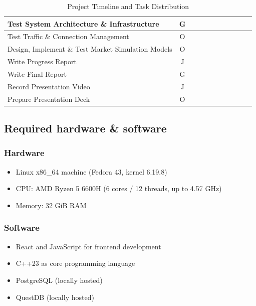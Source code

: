 \documentclass[12pt,a4paper]{article}
\begin{document}
\begin{table}[H]
{\begin{tabular}{|l|c|c|c|c|c|c|c|c|c|c|}
\hline
Test System Architecture \& Infrastructure & G & & & & & \cellcolor{gray!80} & \cellcolor{gray!80} & & & \\
\hline
Test Traffic \& Connection Management & O & & & & & \cellcolor{gray!80} & \cellcolor{gray!80} & & & \\
\hline
Design, Implement \& Test Market Simulation Models & O & & & & & \cellcolor{gray!80} & \cellcolor{gray!80} & \cellcolor{gray!80} & \cellcolor{gray!80} & \\
\hline
Write Progress Report & J & & & & & & \cellcolor{gray!80} & & & \\
\hline
Write Final Report & G & & & & & & & & & \cellcolor{gray!80} \\
\hline
Record Presentation Video & J & & & & & & & & & \cellcolor{gray!80} \\
\hline
Prepare Presentation Deck & O & & & & & & & & & \cellcolor{gray!80} \\
\hline
\end{tabular}
}
\caption{Project Timeline and Task Distribution}
\end{table}

\subsection{Required hardware \& software}
\subsubsection{Hardware}

\begin{itemize}
    \item Linux x86\_64 machine (Fedora 43, kernel 6.19.8)
    \item CPU: AMD Ryzen 5 6600H (6 cores / 12 threads, up to 4.57 GHz)
    \item Memory: 32 GiB RAM
\end{itemize}

\subsubsection{Software}

\begin{itemize}
    \item React and JavaScript for frontend development
    \item C++23 as core programming language
    \item PostgreSQL (locally hosted)
    \item QuestDB (locally hosted)
\end{itemize}
\end{document}
